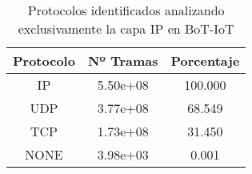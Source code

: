 \begin{table}[H]
    \begin{center}
        \begin{tabular}{|c | c c|} 
            \hline
            \textbf{Protocolo} & \textbf{Nº Tramas} & \textbf{Porcentaje}\\
            \hline\hline
IP & 5.50e+08 & 100.000 \\
UDP & 3.77e+08 & 68.549 \\
TCP & 1.73e+08 & 31.450 \\
NONE & 3.98e+03 & 0.001 \\
            \hline
        \end{tabular}
    \end{center}
    \caption{Protocolos identificados analizando exclusivamente la capa IP en BoT-IoT}
    \label{table:botiotprotocolsip}
\end{table}
